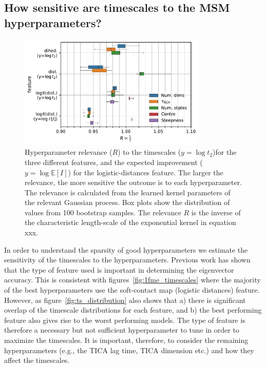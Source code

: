 \documentclass[journal=jacsat,manuscript=article]{achemso}
\begin{document}
\subsection{How sensitive are timescales to the MSM hyperparameters?}\label{sec:sensitivity}

\begin{figure}
    \centering
    \includegraphics[width=0.8\textwidth]{figures/sensitivity.pdf}
    \caption{Hyperparameter relevance ($R$) to the timescales ($y=\log{t_{2}}$)for the three different features,  and the expected improvement ($y=\log{\mathbb{E}[I]}$) for the logistic-distances feature. The larger the relevance, the more sensitive the outcome is to each hyperparameter.  The relevance is calculated from the learned kernel parameters of the relevant Gaussian process. Box plots show the distribution of values from \num{100} bootstrap samples. The relevance $R$ is the inverse of the characteristic length-scale of the exponential kernel in equation xxx. }
    \label{fig:sensitivity}
\end{figure}

In order to understand the sparsity of good hyperparameters we estimate the sensitivity of the timescales to the hyperparameters. Previous work has shown that the type of feature used is important in determining the eigenvector accuracy. This is consistent with figures~\ref{fig:1fme_timescales}  where the majority of the best hyperparameters use the soft-contact map (logistic distances) feature.  However, as figure~\ref{fig:ts_distribution} also shows that a) there is significant overlap of the timescale distributions for each feature, and b) the best performing feature also gives rise to the worst performing models. The type of feature is therefore a necessary but not sufficient hyperparameter to tune in order to maximize the timescales. It is important, therefore, to consider the remaining hyperparameters (e.g., the TICA lag time, TICA dimension etc.) and how they affect the timescales.  
\end{document}
